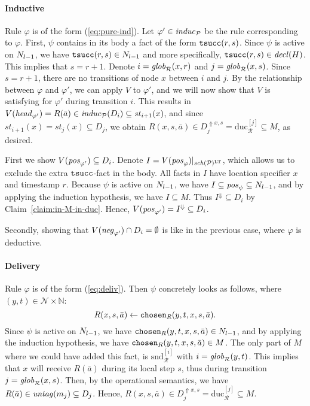 \documentclass{tlp}
\newcommand{\Nat}{\mathbb{N}}  \newcommand{\len}[1]{|#1|} \newcommand{\rom}[1]{\text{\emph{(#1)}}} \newcommand{\romI}{\rom i}
\newcommand{\ded}{\mathcal{P}}
\newcommand{\proj}[2]{#1|_{#2}}
\newcommand{\rl}{\varphi}
\newcommand{\head}[1]{\fname{head}_{#1}}
\newcommand{\bpos}[1]{\fname{pos}_{#1}}
\newcommand{\bneg}[1]{\fname{neg}_{#1}}
\newcommand{\schof}[1]{\fname{sch}(#1)}
\newcommand{\grl}{\psi}
\newcommand{\nw}{\mathcal{N}}
\newcommand{\toloct}[1]{#1^{\mathrm{LT}}}
\newcommand{\addlt}[3]{#1^{\Uparrow#2,#3}}
\newcommand{\droplt}[1]{#1^{\Downarrow}}
\newcommand{\timesucc}{\pred{tsucc}}
\newcommand{\chosen}{\pred{chosen}}
\newcommand{\decl}[1]{\fname{decl}(#1)}
\newcommand{\cnfs}{\mathit{st}}
\newcommand{\run}{\mathcal{R}}
\newcommand{\untag}[1]{\fname{untag}(#1)}
\newcommand{\induc}[1]{\fname{induc}_{#1}}
\newcommand{\mstep}[1]{(#1)}
\newcommand{\globR}[1]{\fname{glob}_{\run}(#1)}
\newcommand{\nwnat}{\nw\times\Nat}
\newcommand{\sliceduc}[1]{\text{duc}_{\run}^{[#1]}}
\newcommand{\slicesnd}[1]{\text{snd}_{\run}^{[#1]}}
\begin{document}
\begin{appendix}
\paragraph*{Inductive}

Rule $\rl$ is of the form (\ref{eq:pure-ind}). Let $\rl'\in\induc{\ded}$
be the rule corresponding to $\rl$. First, $\grl$ contains in its
body a fact of the form $\timesucc(r,s)$. Since $\grl$ is active
on $N_{l-1}$, we have $\timesucc(r,s)\in\prevN$ and more specifically,
$\timesucc(r,s)\in\decl H$. This implies that $s=r+1$. Denote $i=\globR{x,r}$
and $j=\globR{x,s}$. Since $s=r+1$, there are no transitions of
node $x$ between $i$ and $j$. By the relationship between $\rl$
and $\rl'$, we can apply $V$ to $\rl'$, and we will now show that
$V$ is satisfying for $\rl'$ during transition $i$. This results
in $V(\head{\rl'})=R(\bar{a})\in\induc{\ded}\mstep{D_{i}}\subseteq\cnfs_{i+1}(x)$,
and since $\cnfs_{i+1}(x)=\cnfs_{j}(x)\subseteq D_{j}$, we obtain
$R(x,s,\bar{a})\in\addlt{D_{j}}xs=\sliceduc j\subseteq M$, as desired.

First we show $V(\bpos{\rl'})\subseteq D_{i}$. Denote $I=\proj{V(\bpos{\rl})}{\toloct{\schof{\ded}}}$,
which allows us to exclude the extra $\timesucc$-fact in the body.
All facts in $I$ have location specifier $x$ and timestamp $r$.
Because $\grl$ is active on $N_{l-1}$, we have $I\subseteq\bpos{\grl}\subseteq\prevN$,
and by applying the induction hypothesis, we have $I\subseteq M$.
Thus $\droplt I\subseteq D_{i}$ by Claim~\ref{claim:in-M-in-duc}.
Hence, $V(\bpos{\rl'})=\droplt I\subseteq D_{i}$. 

Secondly, showing that $V(\bneg{\rl'})\cap D_{i}=\emptyset$ is like
in the previous case, where $\rl$ is deductive. 




\paragraph*{Delivery}

Rule $\rl$ is of the form (\ref{eq:deliv}). Then $\grl$ concretely
looks as follows, where $(y,t)\in\nwnat$:
\[
R(x,s,\bar{a})\gets\chosen_{R}(y,t,x,s,\bar{a}).
\]
Since $\grl$ is active on $N_{l-1}$, we have $\chosen_{R}(y,t,x,s,\bar{a})\in\prevN$,
and by applying the induction hypothesis, we have $\chosen_{R}(y,t,x,s,\bar{a})\in M$.
The only part of $M$ where we could have added this fact, is $\slicesnd i$
with $i=\globR{y,t}$. This implies that $x$ will receive $R(\bar{a})$
during its local step $s$, thus during transition $j=\globR{x,s}$.
Then, by the operational semantics, we have $R(\bar{a})\in\untag{m_{j}}\subseteq D_{j}$.
Hence, $R(x,s,\bar{a})\in\addlt{D_{j}}xs=\sliceduc j\subseteq M$.



\end{appendix}
\end{document}
